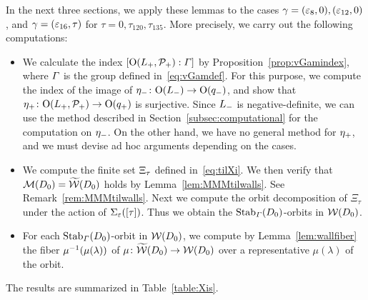 \documentclass{amsart} %
\begin{document}
%
In the next three sections, we apply these lemmas to the cases $\gamma=(\varepsilon_8, 0), (\varepsilon_{12}, 0)$,
and $\gamma=(\varepsilon_{16}, \tau)$ for $\tau=0, \tau_{120}, \tau_{135}$.
More precisely,
we carry out the following computations:
%
\begin{itemize}
\item 
We calculate the index $[\mathord{\mathrm{O}}(L_{+}, \mathord{\mathcal{P}}_{+}):  \varGamma]$ 
by Proposition~\ref{prop:vGamindex},
where $\varGamma$ is the group defined in~\eqref{eq:vGamdef}.
 For this purpose, 
we compute  the index of 
the image of ${\eta}_{-}\colon \mathord{\mathrm{O}}(L_{-})\to \mathord{\mathrm{O}}(q_{-})$, and 
show that 
${\eta}_{+}\colon \mathord{\mathrm{O}}(L_{+}, \mathord{\mathcal{P}}_{+})\to \mathord{\mathrm{O}}(q_{+})$
is surjective.
Since $L_{-}$ is negative-definite,
we can use the method described in Section~\ref{subsec:computational}
for the computation on  ${\eta}_{-}$.
On the other hand, 
we have no general method for ${\eta}_{+}$, and we must devise ad hoc arguments depending on the cases.
\item 
We compute the finite set $\Xi_{\tau}$
defined in~\eqref{eq:tilXi}.
%
%
We then verify that $\mathord{\mathcal{M}}(D_0)=\widetilde{\mathord{\mathcal{W}}} (D_0)$ holds
by Lemma~\ref{lem:MMMtilwalls}.
See Remark~\ref{rem:MMMtilwalls}.
Next we 
compute the orbit decomposition of $\Xi_{\tau}$ under the action of $\Sigma_{\varepsilon}([\tau])$.
Thus we obtain 
the $\operatorname{Stab}_{\varGamma}(D_0)$-orbits in $\mathord{\mathcal{W}}(D_0)$.
\item
For each $\operatorname{Stab}_{\varGamma}(D_0)$-orbit in $\mathord{\mathcal{W}}(D_0)$,
we compute by Lemma~\ref{lem:wallfiber} the fiber $\mu^{-1}(\mu(\lambda))$ of $\mu\colon \widetilde{\mathord{\mathcal{W}}}(D_0)\to \mathord{\mathcal{W}}(D_0)$
over a representative $\mu(\lambda)$ of the orbit.
\end{itemize}
%
The results are summarized in Table~\ref{table:Xis}.
%
%
\end{document}
